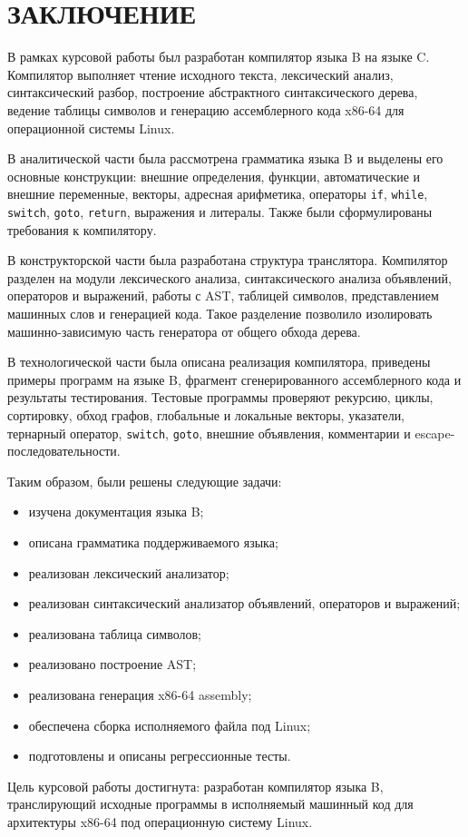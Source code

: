 \chapter*{ЗАКЛЮЧЕНИЕ}

В рамках курсовой работы был разработан компилятор языка B на языке C. Компилятор выполняет чтение исходного текста, лексический анализ, синтаксический разбор, построение абстрактного синтаксического дерева, ведение таблицы символов и генерацию ассемблерного кода x86-64 для операционной системы Linux.

В аналитической части была рассмотрена грамматика языка B и выделены его основные конструкции: внешние определения, функции, автоматические и внешние переменные, векторы, адресная арифметика, операторы \texttt{if}, \texttt{while}, \texttt{switch}, \texttt{goto}, \texttt{return}, выражения и литералы. Также были сформулированы требования к компилятору.

В конструкторской части была разработана структура транслятора. Компилятор разделен на модули лексического анализа, синтаксического анализа объявлений, операторов и выражений, работы с AST, таблицей символов, представлением машинных слов и генерацией кода. Такое разделение позволило изолировать машинно-зависимую часть генератора от общего обхода дерева.

В технологической части была описана реализация компилятора, приведены примеры программ на языке B, фрагмент сгенерированного ассемблерного кода и результаты тестирования. Тестовые программы проверяют рекурсию, циклы, сортировку, обход графов, глобальные и локальные векторы, указатели, тернарный оператор, \texttt{switch}, \texttt{goto}, внешние объявления, комментарии и escape-последовательности.

Таким образом, были решены следующие задачи:

\begin{itemize}
  \item изучена документация языка B;
  \item описана грамматика поддерживаемого языка;
  \item реализован лексический анализатор;
  \item реализован синтаксический анализатор объявлений, операторов и выражений;
  \item реализована таблица символов;
  \item реализовано построение AST;
  \item реализована генерация x86-64 assembly;
  \item обеспечена сборка исполняемого файла под Linux;
  \item подготовлены и описаны регрессионные тесты.
\end{itemize}

Цель курсовой работы достигнута: разработан компилятор языка B, транслирующий исходные программы в исполняемый машинный код для архитектуры x86-64 под операционную систему Linux.
